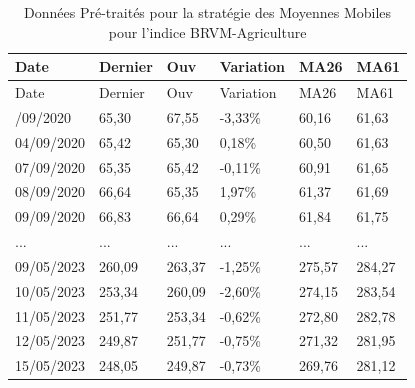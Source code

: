 \hypertarget{tab:multirow}{}
\begin{longtable}[]{@{}llllll@{}}
\caption{Données Pré-traités pour la stratégie des Moyennes Mobiles pour
l'indice BRVM-Agriculture}\tabularnewline
\toprule\noalign{}
Date & Dernier & Ouv & Variation & MA26 & MA61 \\
\midrule\noalign{}
\endfirsthead
\toprule\noalign{}
Date & Dernier & Ouv & Variation & MA26 & MA61 \\
\midrule\noalign{}
\endhead
\bottomrule\noalign{}
\endlastfoot
03/09/2020 & 65,30 & 67,55 & -3,33\% & 60,16 & 61,63 \\
04/09/2020 & 65,42 & 65,30 & 0,18\% & 60,50 & 61,63 \\
07/09/2020 & 65,35 & 65,42 & -0,11\% & 60,91 & 61,65 \\
08/09/2020 & 66,64 & 65,35 & 1,97\% & 61,37 & 61,69 \\
09/09/2020 & 66,83 & 66,64 & 0,29\% & 61,84 & 61,75 \\
... & ... & ... & ... & ... & ... \\
09/05/2023 & 260,09 & 263,37 & -1,25\% & 275,57 & 284,27 \\
10/05/2023 & 253,34 & 260,09 & -2,60\% & 274,15 & 283,54 \\
11/05/2023 & 251,77 & 253,34 & -0,62\% & 272,80 & 282,78 \\
12/05/2023 & 249,87 & 251,77 & -0,75\% & 271,32 & 281,95 \\
15/05/2023 & 248,05 & 249,87 & -0,73\% & 269,76 & 281,12 \\
\end{longtable}

